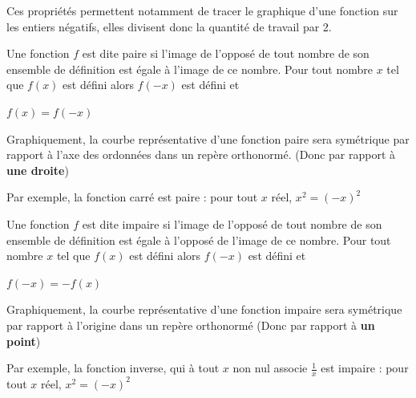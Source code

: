 \documentclass[10pt,a4paper,oneside]{book}
\begin{document}
Ces propriétés permettent notamment de tracer le graphique d'une fonction sur les entiers négatifs, elles divisent donc la quantité de travail par 2.

\begin{de}
    Une fonction $f$ est dite paire si l'image de l'opposé de tout nombre de son ensemble de définition est égale à l'image de ce nombre. Pour tout nombre $x$ tel que $f(x)$ est défini  alors $f(-x)$ est défini et 
    \vspace{0.3cm}
    \begin{center}
    $f(x)=f(-x)$
    \end{center}
\end{de}

Graphiquement, la courbe représentative d'une fonction paire sera symétrique par rapport à l'axe des ordonnées dans un repère orthonormé. (Donc par rapport à  \textbf{une droite})

Par exemple, la fonction carré est paire : pour tout $x$ réel, $x^2=(-x)^2$


\begin{de}
    Une fonction $f$ est dite impaire si l'image de l'opposé de tout nombre de son ensemble de définition est égale à l'opposé de l'image de ce nombre. Pour tout nombre $x$ tel que $f(x)$ est défini  alors $f(-x)$ est défini et 
    \vspace{0.3cm}
    \begin{center}
    $f(-x)=-f(x)$
    \end{center}
\end{de}

Graphiquement, la courbe représentative d'une fonction impaire sera symétrique par rapport à l'origine dans un repère orthonormé (Donc par rapport à  \textbf{un point})

Par exemple, la fonction inverse, qui à tout $x$ non nul associe $\frac{1}{x}$  est impaire : pour tout $x$ réel, $x^2=(-x)^2$
\begin{center}
\end{center}
\end{document}
